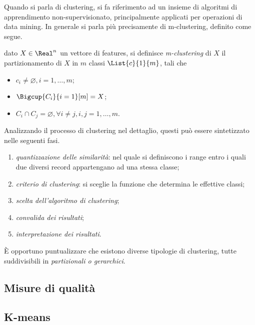 \documentclass{subfiles}
\begin{document}
Quando si parla di clustering, si fa riferimento ad un insieme di algoritmi di apprendimento non-supervisionato,
principalmente applicati per operazioni di data mining. In generale si parla più precisamente di m-clustering, definito come segue.
\begin{Definition*}
    dato \(X \in \Real^{n}\) un vettore di features, si definisce \emph{m-clustering} di \(X\) il partizionamento di \(X\) in
    \(m\) classi \(\List{c}{1}{m}\), tali che
    \begin{itemize}
        \item \(c_{i} \ne \varnothing, i = 1, \ldots, m\);
        \item \(\Bigcup{C_{i}}{i = 1}[m] = X\);
        \item \(C_{i} \cap C_{j} = \varnothing, \forall i \ne j, i,j = 1, \ldots, m\).
    \end{itemize}
\end{Definition*}

Analizzando il processo di clustering nel dettaglio, questi può essere sintetizzato nelle seguenti fasi.
\begin{enumerate}
    \item \emph{quantizzazione delle similarità}: nel quale si definiscono i range entro i quali due diversi record appartengano ad una stessa classe;
    \item \emph{criterio di clustering}: si sceglie la funzione che determina le effettive classi;
    \item \emph{scelta dell'algoritmo di clustering};
    \item \emph{convalida dei risultati};
    \item \emph{interpretazione dei risultati}.
\end{enumerate}

\begin{Remark*}
    \`E opportuno puntualizzare che esistono diverse tipologie di clustering, tutte suddivisibili in \emph{partizionali \emph{o} gerarchici}.
\end{Remark*}

\subsection{Misure di qualità}


\subsection{K-means}

\clearpage
\end{document}
